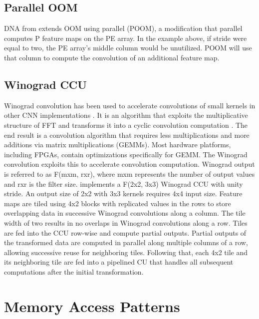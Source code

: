 \subsection{Parallel OOM}
DNA from \cite{tu2017deep} extends OOM using parallel (POOM), a modification that parallel computes P feature maps on the PE array. In the example above, if stride were equal to two, the PE array’s middle column would be unutilized. POOM will use that column to compute the convolution of an additional feature map.

\subsection{Winograd CCU}
Winograd convolution \cite{winograd1980arithmetic} has been used to accelerate convolutions of small kernels in other CNN implementations \cite{dicecco2016caffeinated, lavin2016fast, lu2017evaluating}. It is an algorithm that exploits the multiplicative structure of FFT and transforms it into a cyclic convolution computation \cite{winograd1976computing}. The end result is a convolution algorithm that requires less multiplications and more additions via matrix multiplications (GEMMs). Most hardware platforms, including FPGAs, contain optimizations specifically for GEMM. The Winograd convolution exploits this to accelerate convolution computation. Winograd output is referred to as F(mxm, rxr), where mxm represents the number of output values and rxr is the filter size. \cite{dicecco2016caffeinated} implements a F(2x2, 3x3) Winograd CCU with unity stride. An output size of 2x2 with 3x3 kernels requires 4x4 input size. Feature maps are tiled using 4x2 blocks with replicated values in the rows to store overlapping data in successive Winograd convolutions along a column. The tile width of two results in no overlaps in Winograd convolutions along a row. Tiles are fed into the CCU row-wise and compute partial outputs. Partial outputs of the transformed data are computed in parallel along multiple columns of a row, allowing successive reuse for neighboring tiles. Following that, each 4x2 tile and its neighboring tile are fed into a pipelined CU that handles all subsequent computations after the initial transformation.

\section{Memory Access Patterns}
